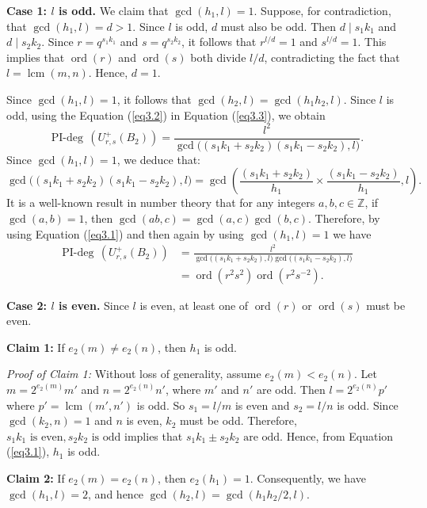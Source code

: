 \documentclass[12 pt,reqno]{amsart}
\numberwithin{equation}{section}
\DeclareMathOperator{\ord}{ord}
\theoremstyle{definition}
\theoremstyle{definition}
\theoremstyle{remark}
\theoremstyle{remark}
\begin{document}
\noindent\textbf{Case 1: $l$ is odd.} We claim that $\gcd(h_1, l) = 1$. Suppose, for contradiction, that $\gcd(h_1, l) = d > 1$. Since $l$ is odd, $d$ must also be odd. Then $d \mid s_1k_1$ and $d \mid s_2k_2$. Since $r = q^{s_1k_1}$ and $s = q^{s_2k_2}$, it follows that $r^{l/d} = 1$ and $s^{l/d} = 1$. This implies that $\operatorname{ord}(r)$ and $\operatorname{ord}(s)$ both divide $l/d$, contradicting the fact that $l = \operatorname{lcm}(m, n)$. Hence, $d = 1$. 

\noindent Since $\gcd(h_1, l) = 1$, it follows that $\gcd(h_2, l) = \gcd(h_1 h_2, l)$. Since $l$ is odd, using the Equation (\ref{eq3.2}) in Equation (\ref{eq3.3}), we obtain
$$
\operatorname{PI-deg}\, \left(U_{r,s}^+(B_2)\right) = \frac{l^2}{\gcd\big((s_1k_1 + s_2k_2)(s_1k_1 - s_2k_2), l\big)}.
$$
Since $\gcd(h_1, l) = 1$, we deduce that:
$$
\gcd\big((s_1k_1 + s_2k_2)(s_1k_1 - s_2k_2), l\big) = \gcd\left( \frac{(s_1k_1 + s_2k_2)}{h_1} \times \frac{(s_1k_1 - s_2k_2)}{h_1}, l\right).
$$
It is a well-known result in number theory that for any integers $a, b, c \in \mathbb{Z}$, if $\gcd(a, b) = 1$, then
$\gcd(ab, c) = \gcd(a, c)\gcd(b, c).$ Therefore, by using Equation (\ref{eq3.1}) and then again by using $\gcd(h_1, l) = 1$ we have
\begin{align*}
\operatorname{PI-deg}\, \left(U_{r,s}^+(B_2)\right) &= \frac{l^2}{\gcd\big((s_1k_1 + s_2k_2), l\big)\gcd\big((s_1k_1 - s_2k_2), l\big)}\\[1em]
&=\ord(r^2s^2)\ord(r^2s^{-2}).
\end{align*}

\noindent\textbf{Case 2: $l$ is even.} Since $l$ is even, at least one of $\ord(r)$ or $\ord(s)$ must be even.

\noindent \textbf{Claim 1:} If $e_2(m) \neq e_2(n)$, then $h_1$ is odd.

\noindent\textit{Proof of Claim 1:}  Without loss of generality, assume $e_2(m) < e_2(n)$. Let $m = 2^{e_2(m)} m'$ and $n = 2^{e_2(n)} n'$, where $m'$ and $n'$ are odd. Then $l = 2^{e_2(n)} p'$ where $p' = \operatorname{lcm}(m',n')$ is odd. So $s_1 = l/m$ is even and $s_2 = l/n$ is odd. Since $\gcd(k_2, n) = 1$ and $n$ is even, $k_2$ must be odd. Therefore, $s_1k_1 \text{ is even}, s_2k_2 \text{ is odd}$ implies that $s_1k_1 \pm s_2k_2 \text{ are odd}.$ Hence, from Equation (\ref{eq3.1}), $h_1 $ is odd.

\noindent \textbf{Claim 2:} If $e_2(m) = e_2(n)$, then $e_2(h_1)=1.$ Consequently, we have $\gcd\left(h_1, l\right) = 2$, and hence $\gcd(h_2,l)=\gcd(h_1h_2/2,l)$.
\end{document}
